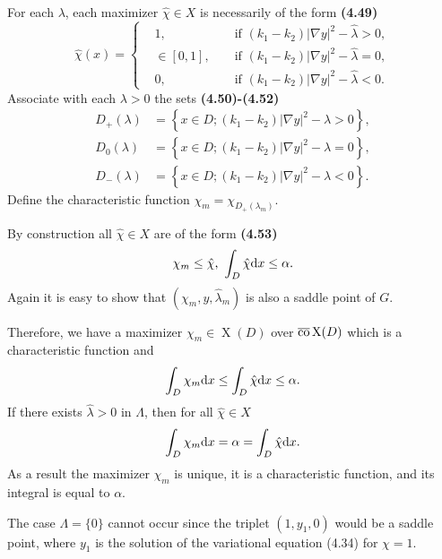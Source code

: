 \documentclass{book}
\numberwithin{equation}{section}
\begin{document}
\begin{enumerate}
    For each $\lambda$, each maximizer $\hat{\chi}\in X$ is necessarily of the form \textbf{(4.49)}
    \begin{equation*}
        \hat{\chi}(x) = \left\{\begin{split}
            &1,&&\mbox{ if } (k_1 - k_2)|\nabla y|^2 - \hat{\lambda} > 0,\\
            &\in[0,1],&&\mbox{ if } (k_1 - k_2)|\nabla y|^2 - \hat{\lambda} = 0,\\
            &0,&&\mbox{ if } (k_1 - k_2)|\nabla y|^2 - \hat{\lambda} < 0.
        \end{split}\right.
    \end{equation*}
    Associate with each $\lambda > 0$ the sets \textbf{(4.50)-(4.52)}
    \begin{align*}
        D_+(\lambda) &= \left\{x\in D;(k_1 - k_2)|\nabla y|^2 - \lambda > 0\right\},\\
        D_0(\lambda) &= \left\{x\in D;(k_1 - k_2)|\nabla y|^2 - \lambda = 0\right\},\\
        D_-(\lambda) &= \left\{x\in D;(k_1 - k_2)|\nabla y|^2 - \lambda < 0\right\}.
    \end{align*}
    Define the characteristic function $\chi_m = \chi_{D_+(\lambda_m)}$.
    
    By construction all $\hat{\chi}\in X$ are of the form \textbf{(4.53)}
    \begin{align*}
        \chi_m\le\hat{\chi},\ \int_D \hat{\chi}{\rm d}x\le\alpha.
    \end{align*}
    Again it is easy to show that $(\chi_m,y,\hat{\lambda}_m)$ is also a saddle point of $G$.
    
    Therefore, we have a maximizer $\chi_m\in\operatorname{X}(D)$ over $\overline{\rm co}\operatorname{X}(D)$ which is a characteristic function and
    \begin{align*}
        \int_D \chi_m{\rm d}x\le\int_D \hat{\chi}{\rm d}x\le\alpha.
    \end{align*}
    If there exists $\hat{\lambda} > 0$ in $\Lambda$, then for all $\hat{\chi}\in X$
    \begin{align*}
        \int_D \chi_m{\rm d}x = \alpha = \int_D \hat{\chi}{\rm d}x.
    \end{align*}
    As a result the maximizer $\chi_m$ is unique, it is a characteristic function, and its integral is equal to $\alpha$.
    
    The case $\Lambda = \{0\}$ cannot occur since the triplet $(1,y_1,0)$ would be a saddle point, where $y_1$ is the solution of the variational equation (4.34) for $\chi = 1$.
    

\end{enumerate}
\end{document}
